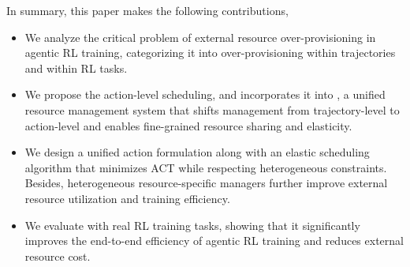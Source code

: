 In summary, this paper makes the following contributions,
\begin{itemize}[leftmargin=10pt]
    \item We analyze the critical problem of external resource over-provisioning in agentic RL training, categorizing it into over-provisioning within trajectories and within RL tasks.
    \item We propose the action-level scheduling, and incorporates it into \sysname, a unified resource management system that shifts management from trajectory-level to action-level and enables fine-grained resource sharing and elasticity.
    \item We design a unified action formulation along with an elastic scheduling algorithm that minimizes ACT while respecting heterogeneous constraints. Besides, heterogeneous resource-specific managers further improve external resource utilization and training efficiency.
    \item We evaluate \sysname with real RL training tasks, showing that it significantly improves the end-to-end efficiency of agentic RL training and reduces external resource cost.

\end{itemize}


